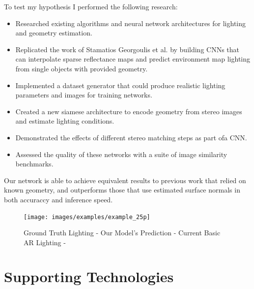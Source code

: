 \documentclass[ %
                    author={Gavin Parker},
                supervisor={Dr. Neill Campbell},
                    degree={MEng},
                     title={Deep Siamese Networks for Illumination Estimation from Stereo Images},
                  subtitle={},
                      type={research},
                      year={2018} ]{dissertation}
\begin{document}
To test my hypothesis I performed the following research:

\noindent
\begin{itemize}
\item Researched existing algorithms and neural network architectures for lighting and geometry estimation.
\item Replicated the work of Stamatios Georgoulis et al. by building CNNs that can interpolate sparse reflectance maps and predict environment map lighting from single objects with provided geometry.
\item Implemented a dataset generator that could produce realistic lighting parameters and images for training networks.
\item Created a new siamese architecture to encode geometry from stereo images and estimate lighting conditions.
\item Demonstrated the effects of different stereo matching steps as part ofa CNN.
\item Assessed the quality of these networks with a suite of image similarity benchmarks.
\end{itemize}

Our network is able to achieve equivalent results to previous work that relied on known geometry, and outperforms those that use estimated surface normals in both accuraccy and inference speed.

\begin{figure}
\centering
\texttt{[image: images/examples/example\_25p]}\\

\caption{Ground Truth Lighting - Our Model's Prediction - Current Basic AR Lighting - }
\label{example_1}
\end{figure}
\chapter*{Supporting Technologies}
\end{document}
